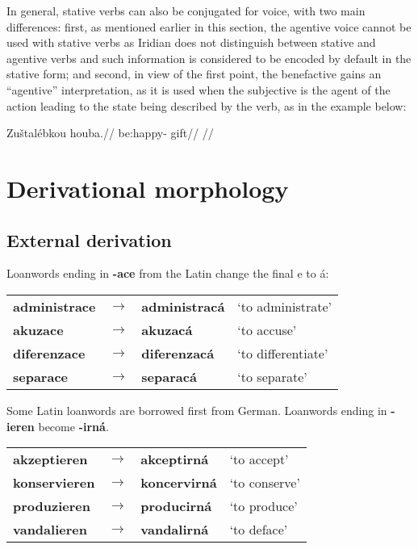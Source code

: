 In general, stative verbs can also be conjugated for voice, with two main differences: first, as mentioned earlier in this section, the agentive voice cannot be used with stative verbs as Iridian does not distinguish between stative and agentive verbs and such information is considered to be encoded by default in the stative form; and second, in view of the first point, the benefactive gains an ``agentive'' interpretation, as it is used when the subjective is the agent of the action leading to the state being described by the verb, as in the example below:

\ex
\begingl
\gla Zuštalébkou houba.//
\glb be:happy- gift//
\glft {}//
\endgl
\xe



\section{Derivational morphology}
\subsection{External derivation}
\par Loanwords ending in \textbf{-ace} from the Latin change the final e to á:
\begin{table}[h!]
	\centering \small
	\begin{tabu} to 0.9
		administrace 	& $\rightarrow$ & administracá 	& `to administrate' \\
		akuzace			& $\rightarrow$ & akuzacá		& `to accuse'\\
		diferenzace		& $\rightarrow$ & diferenzacá	& `to differentiate'\\
		separace		& $\rightarrow$ & separacá		& `to separate'\\
	\end{tabu}
\end{table}
\par Some Latin loanwords are borrowed first from German. Loanwords ending in \textbf{-ieren} become \textbf{-irná}.
\begin{table}[h!]
	\centering \small
	\begin{tabu} to 0.9
		akzeptieren 	& $\rightarrow$ & akceptirná 	& `to accept' \\
		konservieren	& $\rightarrow$ & koncervirná	& `to conserve'\\
		produzieren		& $\rightarrow$ & producirná	& `to produce'\\
		vandalieren		& $\rightarrow$ & vandalirná 	& `to deface'\\
	\end{tabu}
\end{table}
